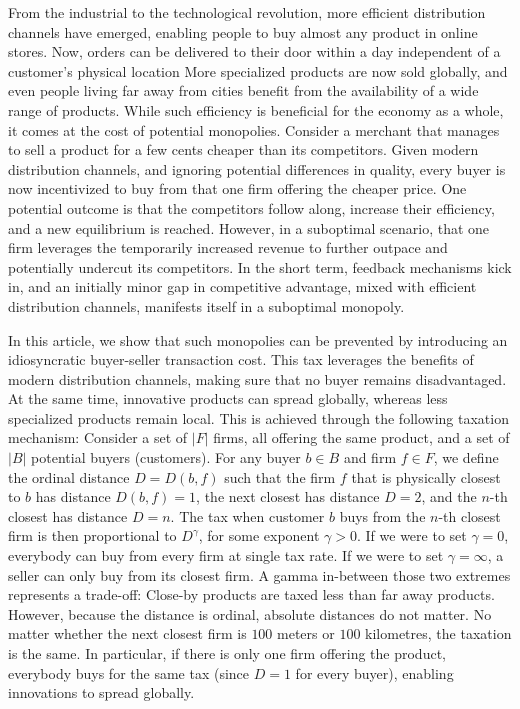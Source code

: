 \documentclass[final,3p,times,authoryear,12pt]{elsarticle}
\begin{document}
From the industrial to the technological revolution, more efficient distribution
channels have emerged, enabling people to buy almost any product in online
stores. Now, orders can be delivered to their door within a day independent of a
customer's physical location  More specialized products are now sold globally,
and even people living far away from cities benefit from the availability of a
wide range of products. While such efficiency is beneficial for the economy as a
whole, it comes at the cost of potential monopolies.  Consider a merchant that
manages to sell a product for a few cents cheaper than its competitors.  Given
modern distribution channels, and ignoring potential differences in quality,
every buyer is now incentivized to buy from that one firm offering the cheaper
price. One potential outcome is that the competitors follow along, increase
their efficiency, and a new equilibrium is reached.  However, in a suboptimal
scenario, that one firm leverages the temporarily increased revenue to further
outpace and potentially undercut its competitors.  In the short term, feedback
mechanisms kick in, and an initially minor gap in competitive advantage, mixed
with efficient distribution channels, manifests itself in a suboptimal monopoly. 

In this article, we show that such monopolies can be prevented by introducing an idiosyncratic buyer-seller transaction cost.
This tax leverages the benefits of modern distribution channels, making sure that no buyer remains disadvantaged. 
At the same time, innovative products can spread globally, whereas less specialized products remain local. 
This is achieved through the following taxation mechanism: 
Consider a set of $|F|$ firms, all offering the same product, and a set of $|B|$ potential buyers (customers). 
For any buyer $b \in B$ and firm $f \in F$, we define the ordinal distance $D = D(b,f)$ such that the firm $f$ that is physically closest to $b$ has distance $D(b,f)=1$, the next closest has distance $D=2$, and the $n$-th closest has distance $D=n$. 
The tax when customer $b$ buys from the $n$-th closest firm is then proportional to $D^\gamma$, for some exponent $\gamma > 0$. 
If we were to set $\gamma = 0$, everybody can buy from every firm at single tax rate. 
If we were to set $\gamma=\infty$, a seller can only buy from its closest firm.
A gamma in-between those two extremes represents a trade-off: 
Close-by products are taxed less than far away products. 
However, because the distance is ordinal, absolute distances do not matter. 
No matter whether the next closest firm is $100$ meters or $100$ kilometres, the taxation is the same. 
In particular, if there is only one firm offering the product, everybody buys for the same tax (since $D=1$ for every buyer), enabling innovations to spread globally.  
\end{document}
